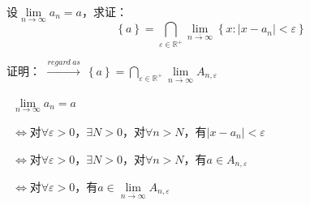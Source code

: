 \begin{eg}
设$\lim \limits_{n \to \infty} a_{n} = a$，求证：
\[\left\{a\right\} = \bigcap \limits_{\varepsilon \in \mathbb{R}^{+}} \lim \limits_{\overline{n \to \infty}}\left\{x : \left\lvert x - a_{n} \right\rvert < \varepsilon \right\} \]
\end{eg}
\noindent 证明：
$\xrightarrow{regard \ as} \ \left\{a\right\} = \bigcap \limits_{\varepsilon \in \mathbb{R}^{+}} \lim \limits_{\overline{n \to \infty}}A_{n,\varepsilon } $
\par \ $\lim \limits_{n \to \infty} a_{n} = a$
\par \ $\Leftrightarrow$对$\forall \varepsilon > 0$，$\exists N > 0$，对$\forall n > N$，有$\left\lvert x - a_{n} \right\rvert  < \varepsilon$
\par \ $\Leftrightarrow$对$\forall \varepsilon > 0$，$\exists N > 0$，对$\forall n > N$，有$a \in A_{n,\varepsilon }$
\par \ $\Leftrightarrow$对$\forall \varepsilon > 0$，有$a \in \lim \limits_{\overline{n \to \infty}}A_{n,\varepsilon }$

